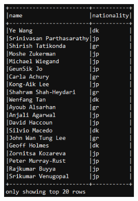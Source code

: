 \documentclass{Configuration_Files/PoliMi3i_thesis}
\begin{document}
\begin{figure}[H]
\centering
\includegraphics[width=0.6\textwidth]{query/spark_q3.PNG}
\label{fig:query3}
\end{figure}
\end{document}
